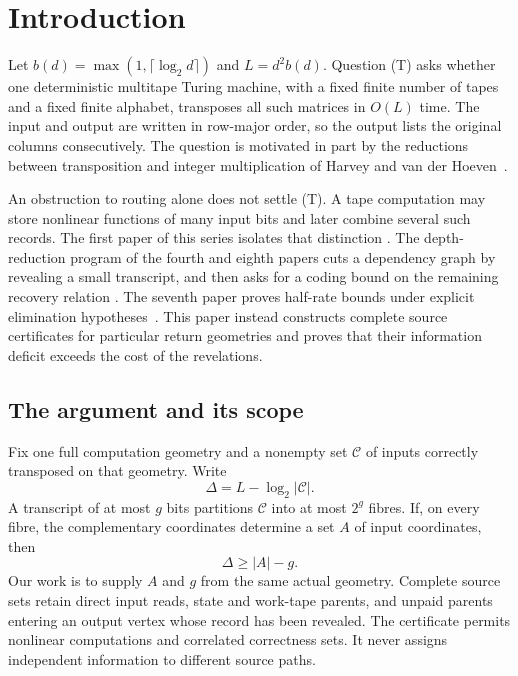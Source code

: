 \section{Introduction}\label{sec:introduction}

Let $b(d)=\max(1,\lceil\log_2d\rceil)$ and $L=d^2b(d)$.
Question (T) asks whether one deterministic multitape Turing machine, with a fixed
finite number of tapes and a fixed finite alphabet, transposes all such matrices
in $O(L)$ time. The input and output are written in row-major order, so the
output lists the original columns consecutively. The question is motivated in
part by the reductions between transposition and integer multiplication of
Harvey and van der Hoeven~\cite{HvdH2025}.

An obstruction to routing alone does not settle (T). A tape computation may
store nonlinear functions of many input bits and later combine several such
records. The first paper of this series isolates that distinction
\cite{FirstPaper2026}. The depth-reduction program of the fourth and eighth
papers cuts a dependency graph by revealing a small transcript, and then asks
for a coding bound on the remaining recovery relation
\cite{FourthPaper2026,EighthPaper2026}. The seventh paper proves half-rate
bounds under explicit elimination hypotheses~\cite{SeventhPaper2026}.
This paper instead constructs complete source certificates for particular
return geometries and proves that their information deficit exceeds the
cost of the revelations.

\subsection{The argument and its scope}

Fix one full computation geometry and a nonempty set $\mathcal C$ of inputs
correctly transposed on that geometry. Write
\[
 \Delta=L-\log_2|\mathcal C|.
\]
A transcript of at most $g$ bits partitions $\mathcal C$ into at most $2^g$
fibres. If, on every fibre, the complementary coordinates determine a set
$A$ of input coordinates, then
\begin{equation}\label{eq:intro-paid-deficit}
 \Delta\ge |A|-g.
\end{equation}
Our work is to supply $A$ and $g$ from the same actual geometry. Complete
source sets retain direct input reads, state and work-tape parents, and
unpaid parents entering an output vertex whose record has been revealed.
The certificate permits nonlinear computations and correlated correctness
sets. It never assigns independent information to different source paths.

